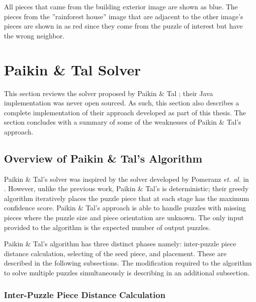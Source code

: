 \documentclass{report}
\begin{document}
All pieces that came from the building exterior image are shown as blue.  The pieces from the ''rainforest house'' image that are adjacent to the other image's pieces are shown in as red since they come from the puzzle of interest but have the wrong neighbor.









\pagebreak
\section{Paikin \& Tal Solver}\label{sec:paikinTalSolver}

This section reviews the solver proposed by Paikin \& Tal \cite{paikin2015}; their Java implementation was never open sourced.  As such, this section also describes a complete implementation of their approach developed as part of this thesis.  The section concludes with a summary of some of the weaknesses of Paikin \& Tal's approach. 

\subsection{Overview of Paikin \& Tal's Algorithm}\label{sec:paikinTalAlgorithm}

Paikin \& Tal's solver was inspired by the solver developed by Pomeranz \textit{et. al.} in \cite{pomeranz2011}.  However, unlike the previous work, Paikin \& Tal's is deterministic; their greedy algorithm iteratively places the puzzle piece that at each stage has the maximum confidence score. Paikin \& Tal's approach is able to handle puzzles with missing pieces where the puzzle size and piece orientation are unknown.  The only input provided to the algorithm is the expected number of output puzzles.

Paikin \& Tal's algorithm has three distinct phases namely: inter-puzzle piece distance calculation, selecting of the seed piece, and placement.  These are described in the following subsections.  The modification required to the algorithm to solve multiple puzzles simultaneously is describing in an additional subsection.

\subsubsection{Inter-Puzzle Piece Distance Calculation}\label{sec:paikinTalInterPieceDistance}
\end{document}
